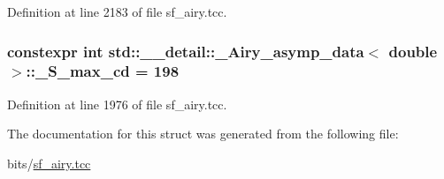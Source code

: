 Definition at line 2183 of file sf\+\_\+airy.\+tcc.

\subsubsection[{\texorpdfstring{\+\_\+\+S\+\_\+max\+\_\+cd}{_S_max_cd}}]{\setlength{\rightskip}{0pt plus 5cm}constexpr int {\bf std\+::\+\_\+\+\_\+detail\+::\+\_\+\+Airy\+\_\+asymp\+\_\+data}$<$ double $>$\+::\+\_\+\+S\+\_\+max\+\_\+cd = 198\hspace{0.3cm}{\ttfamily [static]}}\hypertarget{structstd_1_1____detail_1_1__Airy__asymp__data_3_01double_01_4_a38e485184d2762e83a27937efc343d01}{}\label{structstd_1_1____detail_1_1__Airy__asymp__data_3_01double_01_4_a38e485184d2762e83a27937efc343d01}


Definition at line 1976 of file sf\+\_\+airy.\+tcc.



The documentation for this struct was generated from the following file\+:\begin{DoxyCompactItemize}
\item 
bits/\hyperlink{sf__airy_8tcc}{sf\+\_\+airy.\+tcc}\end{DoxyCompactItemize}
